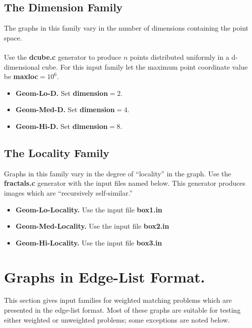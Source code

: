 \subsection{The Dimension Family}
The graphs in this family vary in the number of 
dimensions containing the point space.

\paragraph{ } 
Use the {\bf dcube.c} generator to produce $n$ points distributed
uniformly in a d-dimensional cube.  For this input family let the
maximum point coordinate value be {\bf maxloc}$=10^6$.

\begin{itemize}
\item {\bf Geom-Lo-D.}  Set {\bf dimension}$=2$.
\item {\bf Geom-Med-D.}  Set {\bf dimension}$=4$.
\item {\bf Geom-Hi-D.}  Set {\bf dimension}$=8$. 
\end{itemize} 

\subsection{The Locality Family} 

Graphs in this family vary in the degree of ``locality'' 
in the graph.  Use the {\bf fractals.c} generator 
with the input files named below. 
This generator produces images which are ``recursively self-similar.''

\begin{itemize}
\item { \bf Geom-Lo-Locality.}  Use the input file {\bf box1.in} 

\item { \bf Geom-Med-Locality.} Use the input file {\bf box2.in}

\item {\bf Geom-Hi-Locality.}  Use the input file {\bf box3.in} 
\end{itemize} 

\section{Graphs in Edge-List Format.}

This section gives input families for weighted matching problems which
are presented in the edge-list format.  Most of these graphs are suitable
for testing either weighted or unweighted problems; some exceptions 
are noted below. 


